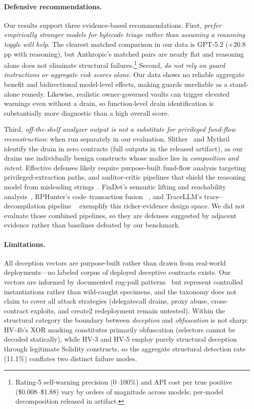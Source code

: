 \documentclass[sigconf]{acmart}
\newcommand{\pp}{\,pp}                  %
\begin{document}
\paragraph{Defensive recommendations.}
Our results support three evidence-based recommendations. First,
\emph{prefer empirically stronger models for bytecode triage rather than
assuming a reasoning toggle will help}. The clearest matched comparison
in our data is GPT-5.2 (+20.8\pp{} with reasoning), but Anthropic's
matched pairs are nearly flat and reasoning alone does not eliminate
structural failures.\footnote{Rating-5 self-warning precision
(0--100\%) and API cost per true positive (\$0.008--\$1.88) vary by orders of
magnitude across models; per-model decomposition released in artifact.}
Second,
\emph{do not rely on guard instructions or aggregate risk scores alone}.
Our data shows no reliable aggregate benefit and bidirectional model-level
effects, making guards unreliable as a stand-alone remedy. Likewise,
realistic owner-governed vaults can trigger elevated warnings even without
a drain, so function-level drain identification is substantially more
diagnostic than a high overall score.

Third, \emph{off-the-shelf analyzer output is not a substitute for
privileged fund-flow reconstruction}: when run separately in our evaluation,
Slither~\cite{feist2019slither} and
Mythril~\cite{mueller2018mythril} identify the drain in zero contracts
(full outputs in the released artifact), as our drains use individually benign
constructs whose malice lies in \emph{composition and intent}.
Effective defenses likely require purpose-built fund-flow analysis
targeting privileged-extraction paths, and auditor-critic pipelines
that shield the reasoning model from misleading
strings~\cite{hu2023gptlens}. FinDet's semantic lifting and reachability
analysis~\cite{liu2025findet}, RPHunter's code--transaction fusion
~\cite{wu2025rphunter}, and TraceLLM's trace--decompilation pipeline
~\cite{wang2025tracellm} exemplify this richer-evidence design space. We did
not evaluate those combined pipelines, so they are defenses suggested by
adjacent evidence rather than baselines defeated by our benchmark.

\paragraph{Limitations.}
All deception vectors are purpose-built rather than drawn from real-world
deployments---no labeled corpus of deployed deceptive contracts exists.
Our vectors are informed by documented rug-pull patterns~\cite{xia2021trade,mazorra2022donotrug,zhou2024stoppulling}
but represent controlled instantiations rather than wild-caught specimens,
and the taxonomy does not claim to cover all attack strategies (delegatecall
drains, proxy abuse, cross-contract exploits, and create2 redeployment
remain untested). Within the structural category the boundary between
\emph{deception} and \emph{obfuscation} is not sharp: HV-4b's XOR masking
constitutes primarily obfuscation (selectors cannot be decoded statically),
while HV-3 and HV-5 employ purely structural deception through legitimate
Solidity constructs, so the aggregate structural detection rate (11.1\%)
conflates two distinct failure modes.
\end{document}
